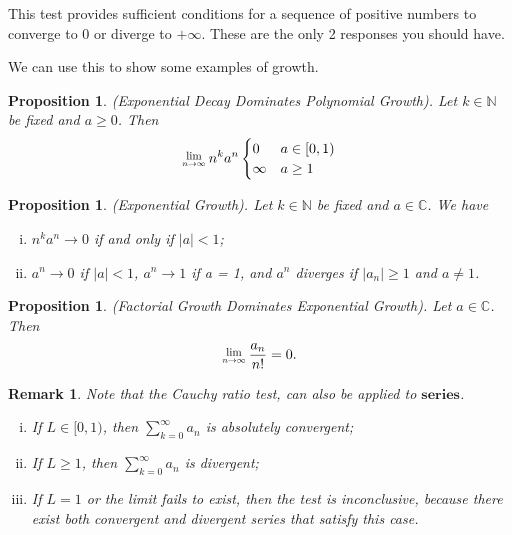 \documentclass[twoside]{article}
\newcommand{\Lim}[1]{\raisebox{0.5ex}{\scalebox{0.8}{$\displaystyle \lim_{#1}\;$}}}
\newtheorem{proposition}[theorem]{Proposition}
\newtheorem{remark}[theorem]{Remark}
\begin{document}
This test provides sufficient conditions for a sequence of positive numbers to converge to 0 or diverge to $+\infty$. These are the only 2 responses you should have.

\bigskip

We can use this to show some examples of growth.

\begin{proposition}
(Exponential Decay Dominates Polynomial Growth). Let $k \in \mathbb{N}$ be fixed and $a \geq 0$. Then
\[\Lim{n \rightarrow \infty}n^ka^n 
  \begin{cases} 
      0 & a \in [0,1) \\
      \infty & a \geq 1\\
   \end{cases}
\]
\end{proposition}

\begin{proposition}
(Exponential Growth). Let $k \in \mathbb{N}$ be fixed and $a \in \mathbb{C}$. We have 
\begin{enumerate}[(i)]
  \item $n^ka^n \rightarrow 0$ if and only if $|a|<1$;
  \item $a^n \rightarrow 0$ if $|a|<1$, $a^n \rightarrow 1$ if a = 1, and $a^n$ diverges if $|a_n| \geq 1$ and $a \neq 1$.
\end{enumerate}
\end{proposition}

\begin{proposition}
(Factorial Growth Dominates Exponential Growth). Let $a \in \mathbb{C}$. Then
$$
\Lim{n \rightarrow \infty}\frac{a_{n}}{n!} = 0.
$$
\end{proposition}

\begin{remark}
Note that the Cauchy ratio test, can also be applied to $\textbf{series}$.
\begin{enumerate}[(i)]
  \item If $L \in [0,1)$, then $\sum_{k=0}^{\infty}a_n$ is absolutely convergent;
  \item If $L \geq 1$, then $\sum_{k=0}^{\infty}a_n$ is divergent;
  \item If $L = 1$ or the limit fails to exist, then the test is inconclusive, because there exist both convergent and divergent series that satisfy this case.
\end{enumerate} 
\end{remark}

\bigskip
\end{document}
